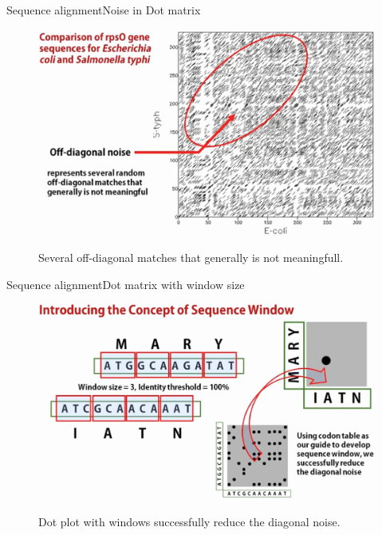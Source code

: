 \documentclass[10pt]{beamer}
\begin{document}
{%

\begin{frame}{Sequence alignment}{Noise in Dot matrix}	
	\begin{figure}[]
		\centering
		\includegraphics[width=\textwidth,height=0.6\textheight,keepaspectratio]{img/alignment/dot_plot5.jpg}
		\label{img:uniprot}
		\caption{Several off-diagonal matches that generally is not meaningfull.}
	\end{figure}
\end{frame}

\begin{frame}{Sequence alignment}{Dot matrix with window size}	
	\begin{figure}[]
		\centering
		\includegraphics[width=\textwidth,height=0.6\textheight,keepaspectratio]{img/alignment/dot_plot6.jpg}
		\label{img:uniprot}
		\caption{Dot plot with windows successfully reduce the diagonal noise.}
	\end{figure}
\end{frame}

}
\end{document}
